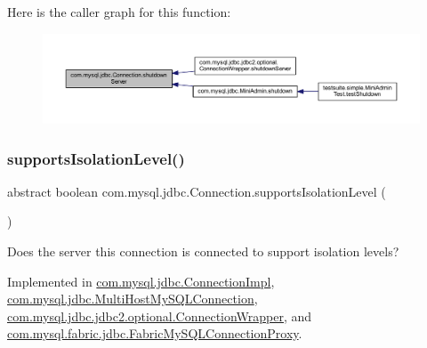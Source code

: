 Here is the caller graph for this function\+:\nopagebreak
\begin{figure}[H]
\begin{center}
\leavevmode
\includegraphics[width=350pt]{interfacecom_1_1mysql_1_1jdbc_1_1_connection_a58ca482a0546e93af285d0e9836d7fae_icgraph}
\end{center}
\end{figure}
\mbox{\label{interfacecom_1_1mysql_1_1jdbc_1_1_connection_aea32f547f2d12d07de7792a6cdb20585}} 
\subsubsection{\texorpdfstring{supports\+Isolation\+Level()}{supportsIsolationLevel()}}
{\footnotesize\ttfamily abstract boolean com.\+mysql.\+jdbc.\+Connection.\+supports\+Isolation\+Level (\begin{DoxyParamCaption}{ }\end{DoxyParamCaption})\hspace{0.3cm}{\ttfamily [abstract]}}

Does the server this connection is connected to support isolation levels? 

Implemented in \mbox{\hyperlink{classcom_1_1mysql_1_1jdbc_1_1_connection_impl_a37c633847df022332f4c4648d28a1048}{com.\+mysql.\+jdbc.\+Connection\+Impl}}, \mbox{\hyperlink{classcom_1_1mysql_1_1jdbc_1_1_multi_host_my_s_q_l_connection_a0c4936bc033352ae568d8ae567f6d495}{com.\+mysql.\+jdbc.\+Multi\+Host\+My\+S\+Q\+L\+Connection}}, \mbox{\hyperlink{classcom_1_1mysql_1_1jdbc_1_1jdbc2_1_1optional_1_1_connection_wrapper_a836c27d27eac131a9226e44e4e57672f}{com.\+mysql.\+jdbc.\+jdbc2.\+optional.\+Connection\+Wrapper}}, and \mbox{\hyperlink{classcom_1_1mysql_1_1fabric_1_1jdbc_1_1_fabric_my_s_q_l_connection_proxy_a5f9c2ce827dc172a0dead6a76ba1d48a}{com.\+mysql.\+fabric.\+jdbc.\+Fabric\+My\+S\+Q\+L\+Connection\+Proxy}}.

